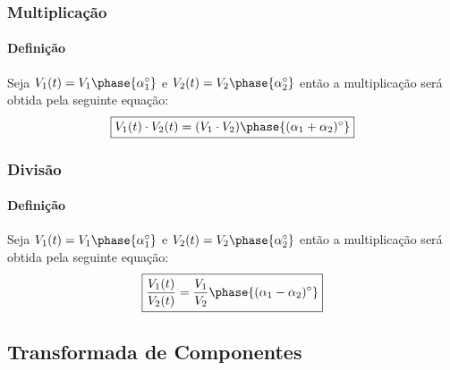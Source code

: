 \documentclass{article}
\begin{document}
            \begin{multicols}{2}
                \raggedcolumns
                \subsubsection{Multiplicação}
                    \paragraph{Definição}Seja $V_{1}(t) = V_{1} \phase{\alpha_{1}^{\circ}}$ e $V_{2}(t) = V_{2} \phase{\alpha_{2}^{\circ}}$ então a multiplicação será obtida pela seguinte equação:
                        \begin{equation}
                            \boxed{
                                V_{1}(t) \cdot V_{2}(t) = 
                                (V_{1} \cdot V_{2})\phase{(\alpha_{1} + \alpha_{2})^{\circ}}
                            }
                        \end{equation}

                \columnbreak

                \subsubsection{Divisão}
                    \paragraph{Definição}Seja $V_{1}(t) = V_{1} \phase{\alpha_{1}^{\circ}}$ e $V_{2}(t) = V_{2} \phase{\alpha_{2}^{\circ}}$ então a multiplicação será obtida pela seguinte equação:
                        \begin{equation}
                            \boxed{
                                \frac{V_{1}(t)}{V_{2}(t)} = 
                                \frac{V_{1}}{V_{2}} \phase{(\alpha_{1} - \alpha_{2})^{\circ}}
                            }
                        \end{equation}
            \end{multicols}

        \subsection{Transformada de Componentes}
\end{document}
